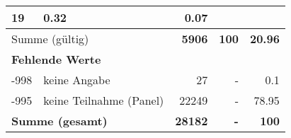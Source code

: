 \begin{longtable}{lXrrr}
       \num{19} &
       \num[round-mode=places,round-precision=2]{0,32} &
         \num[round-mode=places,round-precision=2]{0,07} \\
     \midrule
     \multicolumn{2}{l}{Summe (gültig)} &
       \textbf{\num{5906}} &
     \textbf{100} &
       \textbf{\num[round-mode=places,round-precision=2]{20,96}} \\
     \multicolumn{5}{l}{\textbf{Fehlende Werte}}\\
       -998 &
       keine Angabe &
         \num{27} &
        - &
         \num[round-mode=places,round-precision=2]{0,1} \\
       -995 &
       keine Teilnahme (Panel) &
         \num{22249} &
        - &
         \num[round-mode=places,round-precision=2]{78,95} \\
     \midrule
     \multicolumn{2}{l}{\textbf{Summe (gesamt)}} &
          \textbf{\num{28182}} &
        \textbf{-} &
        \textbf{100} \\
     \bottomrule
     \end{longtable}
     
